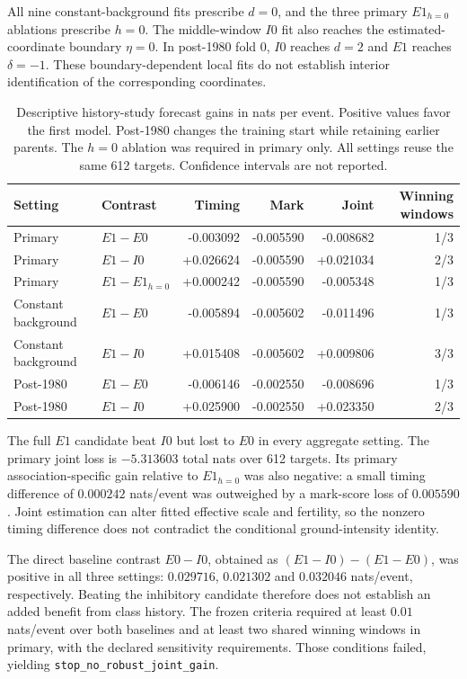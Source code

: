 All nine constant-background fits prescribe \(d=0\), and the three
primary \(E1_{h=0}\) ablations prescribe \(h=0\). The middle-window
\(I0\) fit also reaches the estimated-coordinate boundary \(\eta=0\).
In post-1980 fold 0, \(I0\) reaches \(d=2\) and \(E1\) reaches
\(\delta=-1\). These boundary-dependent local fits do not establish
interior identification of the corresponding coordinates.

\begin{table}[tbp]
\centering\small
\caption{Descriptive history-study forecast gains in nats per event. Positive values
favor the first model. Post-1980 changes the training start while
retaining earlier parents. The \(h=0\) ablation was required in primary
only. All settings reuse the same 612 targets. Confidence intervals are not reported.}
\label{a2:history-results}
\begin{tabular}{llrrrr}
\toprule
Setting & Contrast & Timing & Mark & Joint & Winning windows\\
\midrule
Primary & \(E1-E0\) & -0.003092 & -0.005590 & -0.008682 & 1/3\\
Primary & \(E1-I0\) & +0.026624 & -0.005590 & +0.021034 & 2/3\\
Primary & \(E1-E1_{h=0}\) & +0.000242 & -0.005590 & -0.005348 & 1/3\\
Constant background & \(E1-E0\) & -0.005894 & -0.005602 & -0.011496 & 1/3\\
Constant background & \(E1-I0\) & +0.015408 & -0.005602 & +0.009806 & 3/3\\
Post-1980 & \(E1-E0\) & -0.006146 & -0.002550 & -0.008696 & 1/3\\
Post-1980 & \(E1-I0\) & +0.025900 & -0.002550 & +0.023350 & 2/3\\
\bottomrule
\end{tabular}
\end{table}

The full \(E1\) candidate beat \(I0\) but lost to \(E0\) in every aggregate
setting. The primary joint loss is \(-5.313603\) total nats over 612 targets. Its primary association-specific gain relative to
\(E1_{h=0}\) was also negative: a small timing difference of
\(0.000242\) nats/event was outweighed by a mark-score loss of
\(0.005590\). Joint estimation can alter fitted effective scale and
fertility, so the nonzero timing difference does not contradict the
conditional ground-intensity identity.

The direct baseline contrast \(E0-I0\), obtained as
\((E1-I0)-(E1-E0)\), was positive in all three settings:
\(0.029716\), \(0.021302\) and \(0.032046\) nats/event, respectively.
Beating the inhibitory candidate therefore does not establish an added
benefit from class history. The frozen criteria required at least
\(0.01\) nats/event over both baselines and at least two shared winning
windows in primary, with the declared sensitivity requirements. Those
conditions failed, yielding \texttt{stop\_no\_robust\_joint\_gain}.

